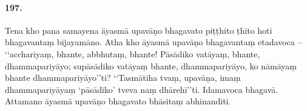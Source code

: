 \paragraph{197.} Tena kho pana samayena āyasmā upavāṇo bhagavato piṭṭhito ṭhito hoti bhagavantaṃ bījayamāno. Atha kho āyasmā upavāṇo bhagavantaṃ etadavoca – ‘‘acchariyaṃ, bhante, abbhutaṃ, bhante! Pāsādiko vatāyaṃ, bhante, dhammapariyāyo; supāsādiko vatāyaṃ bhante, dhammapariyāyo, ko nāmāyaṃ bhante dhammapariyāyo’’ti? ‘‘Tasmātiha tvaṃ, upavāṇa, imaṃ dhammapariyāyaṃ ‘pāsādiko’ tveva naṃ dhārehī’’ti. Idamavoca bhagavā. Attamano āyasmā upavāṇo bhagavato bhāsitaṃ abhinandīti.

